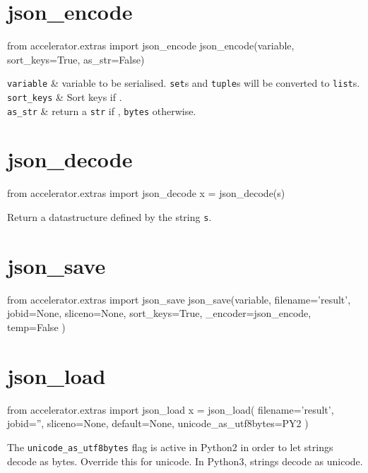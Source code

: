 \section{json\_encode}
\begin{python}
from accelerator.extras import json_encode
json_encode(variable, sort_keys=True, as_str=False)
\end{python}

\starttabletwo
\RPtwo \texttt{variable} & variable to be serialised.  \texttt{set}s and
\texttt{tuple}s will be converted to \texttt{list}s.\\

\RPtwo \texttt{sort\_keys} & Sort keys if \pyTrue.\\

\RPtwo \texttt{as\_str} & return a \texttt{str} if \pyTrue, \texttt{bytes}
otherwise.\\
\stoptabletwo



\section{json\_decode}
\begin{python}
from accelerator.extras import json_decode
x = json_decode(s)
\end{python}
Return a datastructure defined by the string \texttt{s}.




\section{json\_save}
\begin{python}
from accelerator.extras import json_save
json_save(variable,
    filename='result',
    jobid=None,
    sliceno=None,
    sort_keys=True,
    _encoder=json_encode,
    temp=False
)
\end{python}




\section{json\_load}
\begin{python}
from accelerator.extras import json_load
x = json_load(
    filename='result',
    jobid='',
    sliceno=None,
    default=None,
    unicode_as_utf8bytes=PY2
)
\end{python}
The \texttt{unicode\_as\_utf8bytes} flag is active in Python2 in order
to let strings decode as bytes.  Override this for unicode.  In
Python3, strings decode as unicode.





